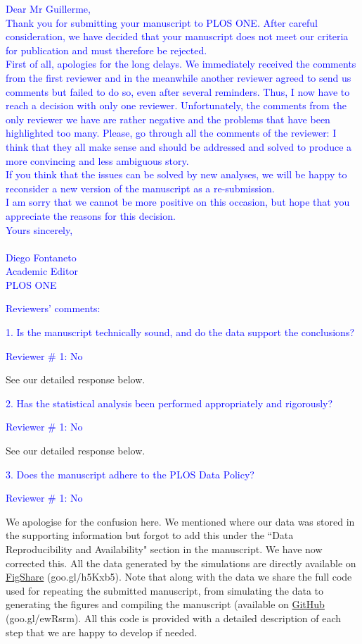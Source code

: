 \documentclass[11pt]{letter}
\begin{document}
\begin{letter}{}
\textcolor{blue}{
Dear Mr Guillerme, \\
Thank you for submitting your manuscript to PLOS ONE. After careful consideration, we have decided that your manuscript does not meet our criteria for publication and must therefore be rejected. \\
First of all, apologies for the long delays. We immediately received the comments from the first reviewer and in the meanwhile another reviewer agreed to send us comments but failed to do so, even after several reminders. Thus, I now have to reach a decision with only one reviewer.
Unfortunately, the comments from the only reviewer we have are rather negative and the problems that have been highlighted too many. Please, go through all the comments of the reviewer: I think that they all make sense and should be addressed and solved to produce a more convincing and less ambiguous story. \\
If you think that the issues can be solved by new analyses, we will be happy to reconsider a new version of the manuscript as a re-submission. \\
I am sorry that we cannot be more positive on this occasion, but hope that you appreciate the reasons for this decision. \\
Yours sincerely, \\ \\
Diego Fontaneto \\ 
Academic Editor \\
PLOS ONE}

\textcolor{blue}{Reviewers' comments:}

\textcolor{blue}{1. Is the manuscript technically sound, and do the data support the conclusions?}

\textcolor{blue}{Reviewer $\#$ 1: No}

See our detailed response below.

\textcolor{blue}{2. Has the statistical analysis been performed appropriately and rigorously?}

\textcolor{blue}{Reviewer $\#$ 1: No}

See our detailed response below.

\textcolor{blue}{3. Does the manuscript adhere to the PLOS Data Policy?}

\textcolor{blue}{Reviewer $\#$ 1: No}

We apologise for the confusion here. We mentioned where our data was stored in the supporting information but forgot to add this under the ``Data Reproducibility and Availability" section in the manuscript. We have now corrected this. All the data generated by the simulations are directly available on \href{http://figshare.com/articles/Effect_of_missing_data_on_topological_inference_using_a_total_evidence_approach/1306861}{FigShare} (goo.gl/h5Kxb5). Note that along with the data we share the full code used for repeating the submitted manuscript, from simulating the data to generating the figures and compiling the manuscript (available on \href{https://github.com/TGuillerme/Total_Evidence_Method-Missing_data}{GitHub} (goo.gl/ewRsrm). All this code is provided with a detailed description of each step that we are happy to develop if needed.


\end{letter}
\end{document}
